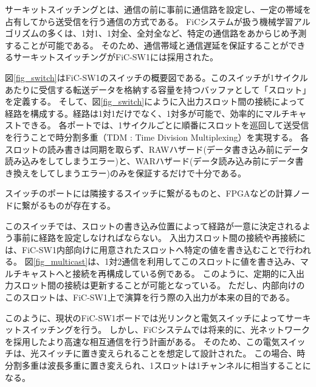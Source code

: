 サーキットスイッチングとは、通信の前に事前に通信路を設定し、一定の帯域を占有してから送受信を行う通信の方式である。
FiCシステムが扱う機械学習アルゴリズムの多くは、1対1、1対全、全対全など、特定の通信路をあからじめ予測することが可能である。
そのため、通信帯域と通信遅延を保証することができるサーキットスイッチングがFiC-SW1には採用された。

図\ref{fig_switch}はFiC-SW1のスイッチの概要図である。このスイッチが1サイクルあたりに受信する転送データを格納する容量を持つバッファとして「スロット」を定義する。
そして、図\ref{fig_switch}にように入出力スロット間の接続によって経路を構成する。経路は1対1だけでなく、1対多が可能で、効率的にマルチキャストできる。
各ポートでは、1サイクルごとに順番にスロットを巡回して送受信を行うことで時分割多重（TDM : Time Division Multiplexing）を実現する。
各スロットの読み書きは同期を取らず、RAWハザード(データ書き込み前にデータ読み込みをしてしまうエラー)と、WARハザード(データ読み込み前にデータ書き換えをしてしまうエラー)のみを保証するだけで十分である。

スイッチのポートには隣接するスイッチに繋がるものと、FPGAなどの計算ノードに繋がるものが存在する。

このスイッチでは、スロットの書き込み位置によって経路が一意に決定されるよう事前に経路を設定しなければならない。
入出力スロット間の接続や再接続には、FiC-SW1内部向けに用意されたスロットへ特定の値を書き込むことで行われる。
図\ref{fig_multicast}は、1対2通信を利用してこのスロットに値を書き込み、マルチキャストへと接続を再構成している例である。
このように、定期的に入出力スロット間の接続は更新することが可能となっている。
ただし、内部向けのこのスロットは、FiC-SW1上で演算を行う際の入出力が本来の目的である。

このように、現状のFiC-SW1ボードでは光リンクと電気スイッチによってサーキットスイッチングを行う。
しかし、FiCシステムでは将来的に、光ネットワークを採用したより高速な相互通信を行う計画がある。
そのため、この電気スイッチは、光スイッチに置き変えられることを想定して設計された。
この場合、時分割多重は波長多重に置き変えられ、1スロットは1チャンネルに相当することになる。

